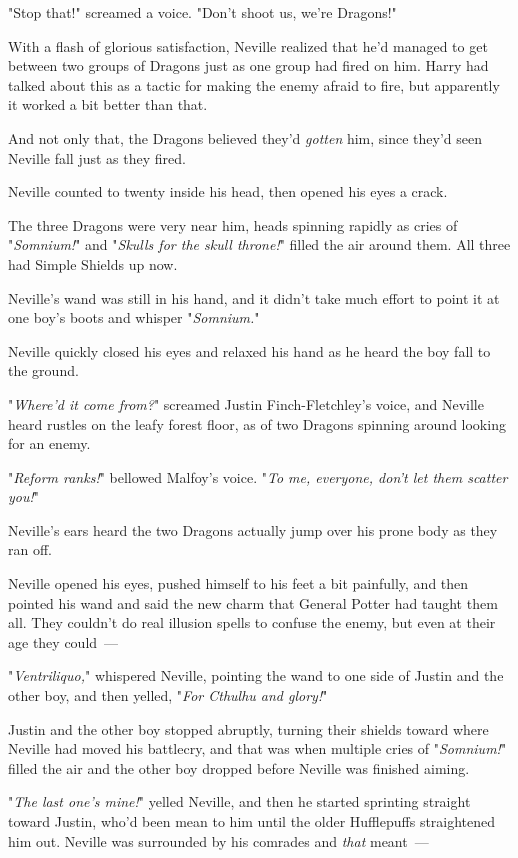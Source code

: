 "Stop that!" screamed a voice. "Don't shoot us, we're Dragons!"

With a flash of glorious satisfaction, Neville realized that he'd managed to
get between two groups of Dragons just as one group had fired on him. Harry had
talked about this as a tactic for making the enemy afraid to fire, but
apparently it worked a bit better than that.

And not only that, the Dragons believed they'd \emph{gotten} him, since they'd
seen Neville fall just as they fired.

Neville counted to twenty inside his head, then opened his eyes a crack.

The three Dragons were very near him, heads spinning rapidly as cries of
"\emph{Somnium!}" and "\emph{Skulls for the skull throne!}" filled the air
around them. All three had Simple Shields up now.

Neville's wand was still in his hand, and it didn't take much effort to point
it at one boy's boots and whisper "\emph{Somnium.}"

Neville quickly closed his eyes and relaxed his hand as he heard the boy fall
to the ground.

"\emph{Where'd it come from?}" screamed Justin Finch-Fletchley's voice, and
Neville heard rustles on the leafy forest floor, as of two Dragons spinning
around looking for an enemy.

"\emph{Reform ranks!}" bellowed Malfoy's voice. "\emph{To me, everyone, don't
let them scatter you!}"

Neville's ears heard the two Dragons actually jump over his prone body as they
ran off.

Neville opened his eyes, pushed himself to his feet a bit painfully, and then
pointed his wand and said the new charm that General Potter had taught them
all. They couldn't do real illusion spells to confuse the enemy, but even at
their age they could~---

"\emph{Ventriliquo,}" whispered Neville, pointing the wand to one side of
Justin and the other boy, and then yelled, "\emph{For Cthulhu and glory!}"

Justin and the other boy stopped abruptly, turning their shields toward where
Neville had moved his battlecry, and that was when multiple cries of
"\emph{Somnium!}" filled the air and the other boy dropped before Neville was
finished aiming.

"\emph{The last one's mine!}" yelled Neville, and then he started sprinting
straight toward Justin, who'd been mean to him until the older Hufflepuffs
straightened him out. Neville was surrounded by his comrades and \emph{that}
meant~---

